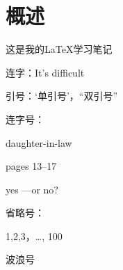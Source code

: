 \section{概述}
这是我的\LaTeX{}学习笔记
\begin{list}{}{}
    \item 连字：It's dif{}f{}icult
    \item 引号：`单引号'，``双引号''
    \item 连字号：
    \item daughter-in-law
    \item pages 13--17
    \item yes ---or no?
    \item 省略号：
    \item 1,2,3，\ldots, 100
    \item 波浪号
\end{list}